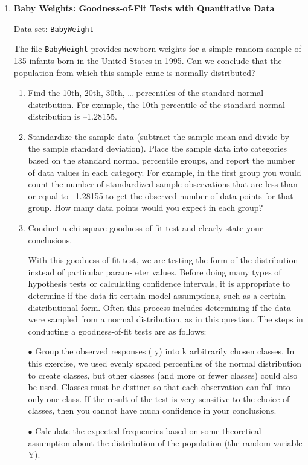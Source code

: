 \documentclass[
]{book}
\begin{document}
\begin{enumerate}
  \item \textbf{Baby Weights: Goodness-of-Fit Tests with Quantitative Data}    

  Data set: \texttt{BabyWeight}    
  
  The file \texttt{BabyWeight} provides newborn weights for a simple random sample of 135 infants born in the United States in 1995. Can we conclude that the population from which this sample came is normally distributed?  
  \begin{enumerate}
    \item Find the 10th, 20th, 30th, … percentiles of the standard normal distribution. For example, the 10th percentile of the standard normal distribution is –1.28155.
    \item Standardize the sample data (subtract the sample mean and divide by the sample standard deviation). Place the sample data into categories based on the standard normal percentile groups, and report the number of data values in each category. For example, in the first group you would count the number of standardized sample observations that are less than or equal to –1.28155 to get the observed number of data points for that group. How many data points would you expect in each group?
    \item Conduct a chi-square goodness-of-fit test and clearly state your conclusions.
    
    With this goodness-of-fit test, we are testing the form of the distribution instead of particular param-
eter values. Before doing many types of hypothesis tests or calculating confidence intervals, it is
appropriate to determine if the data fit certain model assumptions, such as a certain distributional
form. Often this process includes determining if the data were sampled from a normal distribution, as
in this question. The steps in conducting a goodness-of-fit tests are as follows:
  
  $\bullet$ Group the observed responses ( y) into k arbitrarily chosen classes. In this exercise, we used evenly
  spaced percentiles of the normal distribution to create classes, but other classes (and more or fewer
  classes) could also be used. Classes must be distinct so that each observation can fall into only one
  class. If the result of the test is very sensitive to the choice of classes, then you cannot have much
  confidence in your conclusions.
  
  $\bullet$ Calculate the expected frequencies based on some theoretical assumption about the distribution of
  the population (the random variable Y).
  

\end{enumerate}
\end{enumerate}
\end{document}
